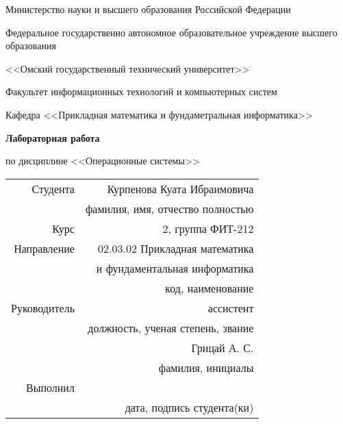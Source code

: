 \documentclass[14pt, a4paper]{article}
\begin{document}
    \thispagestyle{empty}

    \begin{center}
        Министерство науки и высшего образования Российской Федерации

        Федеральное государственно автономное образовательное учреждение высшего образования

        <<Омский государственный технический университет>>

        \vspace{1cm}
        Факультет информационных технологий и компьютерных систем

        Кафедра <<Прикладная математика и фундаметральная информатика>>

        \vspace{3cm}
        \textbf{Лабораторная работа}

        по дисциплине <<Операционные системы>>
    \end{center}
    
    \vspace{3cm}
    \begin{flushright}    
        \begin{tabular}{ r r }
            Студента & Курпенова Куата Ибраимовича \\
            \cline{2-2}
            & \tiny{фамилия, имя, отчество полностью} \\

            Курс & 2, группа ФИТ-212 \\
            \cline{2-2}
            Направление & 02.03.02 Прикладная математика \\
            \cline{2-2}
            & и фундаментальная информатика \\
            \cline{2-2}
            & \tiny{код, наименование} \\

            Руководитель & ассистент \\
            \cline{2-2}
            & \tiny{должность, ученая степень, звание} \\
            & Грицай А. С. \\
            \cline{2-2}
            & \tiny{фамилия, инициалы} \\

            Выполнил & \\
            \cline{2-2}
            & \tiny{дата, подпись студента(ки)} \\
        \end{tabular}
    \end{flushright}
    
\end{document}
